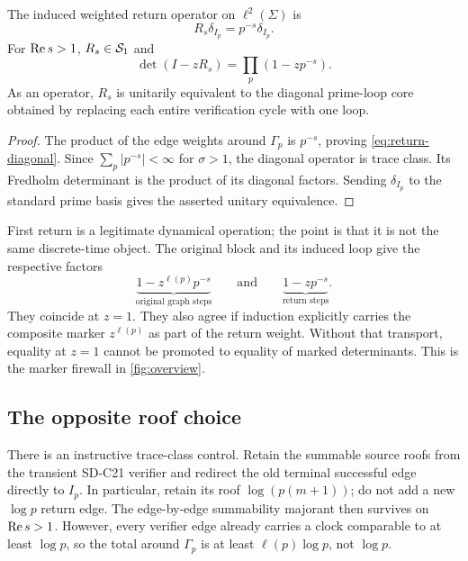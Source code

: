 \begin{theorem}
\label{thm:first-return}
The induced weighted return operator on $\ell^2(\Sigma)$ is
\begin{equation}
R_s\delta_{I_p}=p^{-s}\delta_{I_p}.
\label{eq:return-diagonal}
\end{equation}
For $\operatorname{Re} s>1$, $R_s\in\mathcal{S}_1$ and
\begin{equation}
\det(I-zR_s)=\prod_p(1-zp^{-s}).
\label{eq:return-det}
\end{equation}
As an operator, $R_s$ is unitarily equivalent to the diagonal prime-loop
core obtained by replacing each entire verification cycle with one loop.
\end{theorem}

\begin{proof}
The product of the edge weights around $\Gamma_p$ is $p^{-s}$, proving
\eqref{eq:return-diagonal}.  Since
$\sum_p|p^{-s}|<\infty$ for $\sigma>1$, the diagonal operator is trace class.
Its Fredholm determinant is the product of its diagonal factors.  Sending
$\delta_{I_p}$ to the standard prime basis gives the asserted unitary
equivalence.
\end{proof}

First return is a legitimate dynamical operation; the point is that it is not
the same discrete-time object.  The original block and its induced loop give
the respective factors
\begin{equation}
\underbrace{1-z^{\ell(p)}p^{-s}}_{\text{original graph steps}}
\qquad\text{and}\qquad
\underbrace{1-zp^{-s}}_{\text{return steps}}.
\label{eq:marker-firewall}
\end{equation}
They coincide at $z=1$.  They also agree if induction explicitly carries the
composite marker $z^{\ell(p)}$ as part of the return weight.  Without that
transport, equality at $z=1$ cannot be promoted to equality of marked
determinants.  This is the marker firewall in
\cref{fig:overview}.

\subsection{The opposite roof choice}

There is an instructive trace-class control.  Retain the summable source roofs
from the transient SD-C21 verifier and redirect the old terminal successful
edge directly to $I_p$.  In particular, retain its roof
$\log(p(m+1))$; do not add a new $\log p$ return edge.  The edge-by-edge
summability majorant then survives on $\operatorname{Re} s>1$.  However, every verifier
edge already carries a clock comparable to at least $\log p$, so the total
around $\Gamma_p$ is at least $\ell(p)\log p$, not $\log p$.

